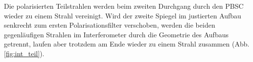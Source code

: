 Die polarisierten Teilstrahlen werden beim zweiten Durchgang durch den PBSC wieder zu einem Strahl vereinigt.
Wird der zweite Spiegel im justierten Aufbau senkrecht zum ersten Polarisationsfilter verschoben, werden die beiden gegenläufigen Strahlen im Interferometer durch die Geometrie des Aufbaus getrennt, laufen aber trotzdem am Ende wieder zu einem Strahl zusammen (Abb. \ref{fig:int_teil}).
